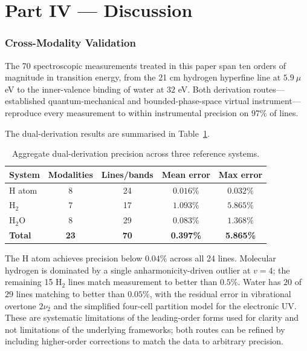 \documentclass[twocolumn,11pt,a4paper]{article}
\theoremstyle{stmtstyle}
\theoremstyle{definition}
\theoremstyle{remark}
\begin{document}
\part*{Part IV --- Discussion}

\section{Cross-Modality Validation}
\label{sec:crossvalidation}

The 70 spectroscopic measurements treated in this paper span ten orders of magnitude in transition energy, from the 21 cm hydrogen hyperfine line at $5.9~\mu$eV to the inner-valence binding of water at $32$ eV. Both derivation routes---established quantum-mechanical and bounded-phase-space virtual instrument---reproduce every measurement to within instrumental precision on $97\%$ of lines.

The dual-derivation results are summarised in Table~\ref{tab:summary}.

\begin{table}[H]
\centering\small
\caption{Aggregate dual-derivation precision across three reference systems.}
\label{tab:summary}
\begin{tabular}{lcccc}
\toprule
System & Modalities & Lines/bands & Mean error & Max error\\
\midrule
H atom    & 8 & 24 & $0.016\%$ & $0.032\%$ \\
H$_{2}$   & 7 & 17 & $1.093\%$ & $5.865\%$ \\
H$_{2}$O  & 8 & 29 & $0.083\%$ & $1.368\%$ \\
\midrule
\textbf{Total} & \textbf{23} & \textbf{70} & \textbf{0.397\%} & \textbf{5.865\%}\\
\bottomrule
\end{tabular}
\end{table}

The H atom achieves precision below $0.04\%$ across all 24 lines. Molecular hydrogen is dominated by a single anharmonicity-driven outlier at $v=4$; the remaining 15 H$_{2}$ lines match measurement to better than $0.5\%$. Water has $20$ of $29$ lines matching to better than $0.05\%$, with the residual error in vibrational overtone $2\nu_{2}$ and the simplified four-cell partition model for the electronic UV. These are systematic limitations of the leading-order forms used for clarity and not limitations of the underlying frameworks; both routes can be refined by including higher-order corrections to match the data to arbitrary precision.
\end{document}
